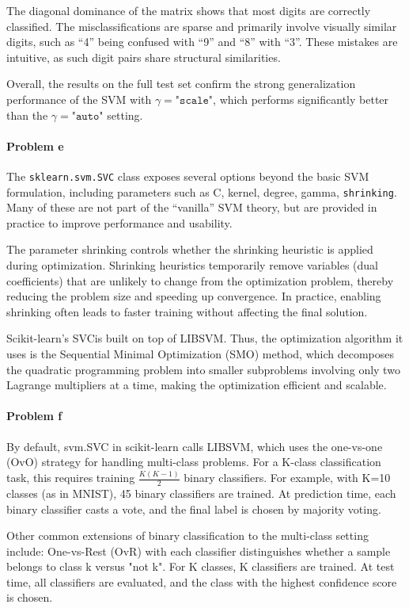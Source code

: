 \documentclass[11pt, reqno, letterpaper, twoside]{amsart}
\theoremstyle{plain}
\theoremstyle{definition}
\begin{document}
The diagonal dominance of the matrix shows that most digits are correctly classified. 
The misclassifications are sparse and primarily involve visually similar digits, 
such as ``4'' being confused with ``9'' and ``8'' with ``3''. 
These mistakes are intuitive, as such digit pairs share structural similarities. 

Overall, the results on the full test set confirm the strong generalization performance of the SVM with $\gamma=\texttt{"scale"}$, 
which performs significantly better than the $\gamma=\texttt{"auto"}$ setting.

\paragraph{Problem e}
The \texttt{sklearn.svm.SVC} class exposes several options beyond the basic SVM formulation, 
including parameters such as C, kernel, degree, gamma, 
 \texttt{shrinking}. Many of these are not part of the “vanilla” SVM theory, 
but are provided in practice to improve performance and usability.

The parameter shrinking controls whether the shrinking 
heuristic is applied during optimization. Shrinking heuristics temporarily remove variables 
(dual coefficients) that are unlikely to change from the optimization problem, 
thereby reducing the problem size and speeding up convergence. 
In practice, enabling shrinking often leads to faster training without affecting the final solution.

Scikit-learn's SVCis built on top of LIBSVM. 
Thus, the optimization algorithm it uses is the Sequential Minimal Optimization (SMO) method, 
which decomposes the quadratic programming problem into smaller subproblems involving 
only two Lagrange multipliers at a time, making the optimization efficient and scalable.\\

\paragraph{Problem f}
By default, svm.SVC in scikit-learn calls LIBSVM, which uses the one-vs-one (OvO) strategy 
for handling multi-class problems. For a K-class classification task, this requires training 
$\tfrac{K(K-1)}{2}$ binary classifiers. For example, with K=10 classes (as in MNIST), 
45 binary classifiers are trained. At prediction time, each binary classifier casts a vote, 
and the final label is chosen by majority voting.

Other common extensions of binary classification to the multi-class setting include:
One-vs-Rest (OvR) with each classifier distinguishes whether a sample belongs to class k versus "not k". 
For K classes, K classifiers are trained. At test time, all classifiers are evaluated, 
and the class with the highest confidence score is chosen.
\end{document}
